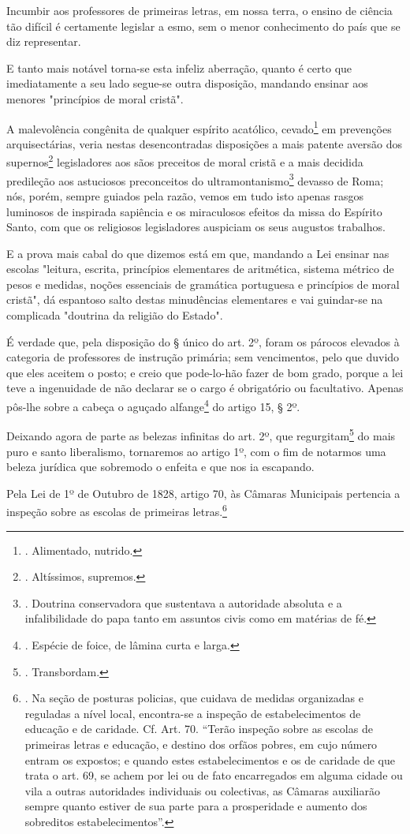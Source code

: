 Incumbir aos professores de primeiras letras, em nossa terra, o ensino
de ciência tão difícil é certamente legislar a esmo, sem o menor
conhecimento do país que se diz representar.

E tanto mais notável torna-se esta infeliz aberração, quanto é certo que
imediatamente a seu lado segue-se outra disposição, mandando ensinar aos
menores "princípios de moral cristã".

A malevolência congênita de qualquer espírito acatólico,
cevado\footnote{. Alimentado, nutrido.} em prevenções arquisectárias,
veria nestas desencontradas disposições a mais patente aversão dos
supernos\footnote{. Altíssimos, supremos.} legisladores aos sãos
preceitos de moral cristã e a mais decidida predileção aos astuciosos
preconceitos do ultramontanismo\footnote{. Doutrina conservadora que
  sustentava a autoridade absoluta e a infalibilidade do papa tanto em
  assuntos civis como em matérias de fé.} devasso de Roma; nós, porém,
sempre guiados pela razão, vemos em tudo isto apenas rasgos luminosos de
inspirada sapiência e os miraculosos efeitos da missa do Espírito Santo,
com que os religiosos legisladores auspiciam os seus augustos trabalhos.

E a prova mais cabal do que dizemos está em que, mandando a Lei ensinar
nas escolas "leitura, escrita, princípios elementares de aritmética,
sistema métrico de pesos e medidas, noções essenciais de gramática
portuguesa e princípios de moral cristã", dá espantoso salto destas
minudências elementares e vai guindar-se na complicada "doutrina da
religião do Estado".

É verdade que, pela disposição do § único do art. 2º, foram os párocos
elevados à categoria de professores de instrução primária; sem
vencimentos, pelo que duvido que eles aceitem o posto; e creio que
pode-lo-hão fazer de bom grado, porque a lei teve a ingenuidade de não
declarar se o cargo é obrigatório ou facultativo. Apenas pôs-lhe sobre a
cabeça o aguçado alfange\footnote{. Espécie de foice, de lâmina curta e
  larga.} do artigo 15, § 2º.

Deixando agora de parte as belezas infinitas do art. 2º, que
regurgitam\footnote{. Transbordam.} do mais puro e santo liberalismo,
tornaremos ao artigo 1º, com o fim de notarmos uma beleza jurídica que
sobremodo o enfeita e que nos ia escapando.

Pela Lei de 1º de Outubro de 1828, artigo 70, às Câmaras Municipais
pertencia a inspeção sobre as escolas de primeiras letras.\footnote{. Na
  seção de posturas policias, que cuidava de medidas organizadas e
  reguladas a nível local, encontra-se a inspeção de estabelecimentos de
  educação e de caridade. Cf. Art. 70. ``Terão inspeção sobre as escolas
  de primeiras letras e educação, e destino dos orfãos pobres, em cujo
  número entram os expostos; e quando estes estabelecimentos e os de
  caridade de que trata o art. 69, se achem por lei ou de fato
  encarregados em alguma cidade ou vila a outras autoridades individuais
  ou colectivas, as Câmaras auxiliarão sempre quanto estiver de sua
  parte para a prosperidade e aumento dos sobreditos estabelecimentos''.}

